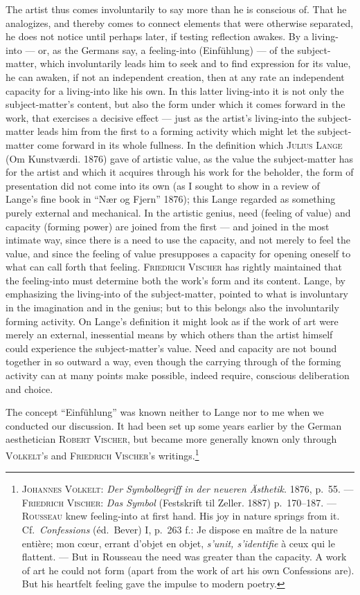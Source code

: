 \documentclass[12pt]{book}
\newcommand{\opage}[1]{\marginnote{\footnotesize\textit{[#1]}}}
\begin{document}
\opage{30}The artist thus comes involuntarily to say more than he is conscious of. That he
analogizes, and thereby comes to connect elements that were otherwise separated,
he does not notice until perhaps later, if testing reflection awakes. By a
living-into --- or, as the Germans say, a feeling-into (Einfühlung) --- of the
subject-matter, which involuntarily leads him to seek and to find expression for
its value, he can awaken, if not an independent creation, then at any rate an
independent capacity for a living-into like his own. In this latter living-into
it is not only the subject-matter's content, but also the form under which it
comes forward in the work, that exercises a decisive effect --- just as the
artist's living-into the subject-matter leads him from the first to a forming
activity which might let the subject-matter come forward in its whole fullness.
In the definition which \textsc{Julius Lange} (Om Kunstværdi. 1876) gave of
artistic value, as the value the subject-matter has for the artist and which it
acquires through his work for the beholder, the form of presentation did not
come into its own (as I sought to show in a review of Lange's fine book in
``Nær og Fjern'' 1876); this Lange regarded as something purely external and
mechanical. In the artistic genius, need (feeling of value) and capacity
(forming power) are joined from the first --- and joined in the most intimate
way, since there is a need to use the capacity, and not merely to feel the
value, and since the feeling of value presupposes a capacity for opening oneself
to what can call forth that feeling. \textsc{Friedrich Vischer} has rightly
maintained that the feeling-into must determine both the work's form and its
content. Lange, by emphasizing the living-into of the subject-matter, pointed to
what is involuntary in the imagination and in the genius; but to this belongs
also the involuntarily forming activity. On Lange's \opage{31}definition it might look as
if the work of art were merely an external, inessential means by which others
than the artist himself could experience the subject-matter's value. Need and
capacity are not bound together in so outward a way, even though the carrying
through of the forming activity can at many points make possible, indeed
require, conscious deliberation and choice.

The concept ``Einfühlung'' was known neither to Lange nor to me when we
conducted our discussion. It had been set up some years earlier by the German
aesthetician \textsc{Robert Vischer}, but became more generally known only
through \textsc{Volkelt}'s and \textsc{Friedrich Vischer}'s
writings.\footnote{\textsc{Johannes Volkelt:} \textit{Der Symbolbegriff in der
neueren Ästhetik.} 1876, p.\ 55. --- \textsc{Friedrich Vischer:} \textit{Das
Symbol} (Festskrift til Zeller. 1887) p.\ 170--187. --- \textsc{Rousseau} knew
feeling-into at first hand. His joy in nature springs from it. Cf.\
\textit{Confessions} (éd.\ Bever) I, p.\ 263 f.: Je dispose en maître de la
nature entière; mon c\oe ur, errant d'objet en objet, \textit{s'unit,
s'identifie} à ceux qui le flattent. --- But in Rousseau the need was greater
than the capacity. A work of art he could not form (apart from the work of art
his own Confessions are). But his heartfelt feeling gave the impulse to modern
poetry.}
\end{document}
